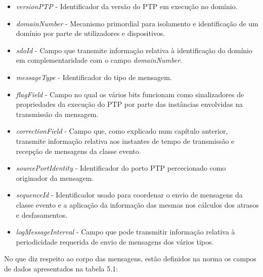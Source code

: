 \begin{itemize}
  \item \textit{versionPTP}  - \quad Identificador da versão do PTP em execução no domínio. 
  \item \textit{\textit{domainNumber}} - \quad Mecanismo primordial para isolamento e identificação de um domínio por parte de utilizadores e dispositivos.
  \item \textit{\textit{sdoId}}  - \quad Campo que transmite informação relativa à identificação do domínio em complementaridade com o campo \textit{domainNumber}.
  \item \textit{messageType} - \quad Identificador do tipo de mensagem.
  \item \textit{flagField}  - \quad Campo no qual os vários bits funcionam como sinalizadores de propriedades da execução do PTP por parte das instâncias envolvidas na transmissão da mensagem.
  \item \textit{correctionField}  - \quad Campo que, como explicado num capítulo anterior, transmite informação relativa aos instantes de tempo de transmissão e recepção de mensagens da classe evento.
  \item \textit{sourcePortIdentity} - \quad Identificador do porto PTP percecionado como originador da mensagem.
  \item \textit{sequenceId}  - \quad Identificador usado para coordenar o envio de mensagens da classe evento e a aplicação da informação das mesmas nos cálculos dos atrasos e desfasamentos. 
  \item \textit{logMessageInterval}  - \quad Campo que pode transmitir informação relativa à periodicidade requerida de envio de mensagens dos vários tipos.
\end{itemize}

No que diz respeito ao corpo das mensagens, estão definidos na norma os campos de dados apresentados na tabela 5.1:


